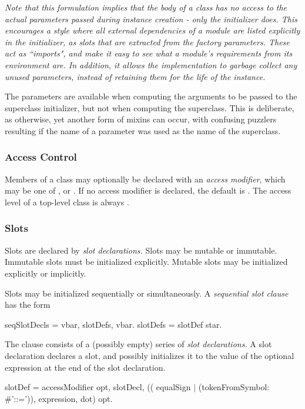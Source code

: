 \documentclass{article}
\begin{document}
{\it Note that this formulation implies that the body of a class has no access to the actual parameters passed during instance creation - only the initializer does. This encourages a style where all external dependencies of a module are listed explicitly in the initializer, as slots that are extracted from the factory parameters. These act as ``imports", and make it easy to see what a module's requirements from its environment are. In addition, it allows the implementation to garbage collect any unused parameters, instead of retaining them for the life of the instance.

The parameters are available when computing the arguments to be passed to the superclass initializer, but not when computing the superclass. This is deliberate, as otherwise, yet another form of mixins can occur,
 with confusing puzzlers resulting if the name of a parameter was used as the name
 of the superclass.}

 

\subsubsection{Access Control}

Members of a class may optionally be declared with an {\em access modifier}, which may be one of \PUBLIC, \PROTECTED{} or \PRIVATE.  If no access modifier is declared, the default is \PROTECTED{}. The access level of a top-level class is always \PUBLIC{}.


\subsubsection{Slots}
\label{slots}

Slots are declared by {\em slot declarations.} 
Slots may be mutable or immutable. Immutable slots must be initialized explicitly. Mutable slots may be initialized explicitly or implicitly. 

Slots may be initialized sequentially or simultaneously. A {\em sequential slot clause} has the form 
\begin{newspeak}
seqSlotDecls = vbar, slotDefs, vbar.
slotDefs = slotDef star.
\end{newspeak}

The clause consists of a (possibly empty) series of {\em slot declarations.}  A slot declaration declares a slot, and possibly initializes it to the value of the optional expression at the end of the slot declaration.
\begin{newspeak}
slotDef =  accessModifier opt, slotDecl, 
     (( equalSign $|$ (tokenFromSymbol: \#'::=')), expression, dot) opt.
\end{newspeak}
\end{document}
